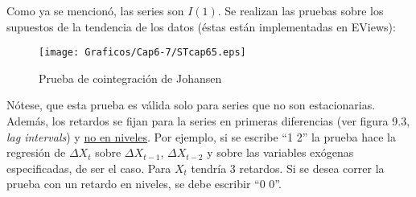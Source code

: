 Como ya se mencion\'{o}, las series son $I(1)$. Se realizan las pruebas sobre los supuestos de la tendencia de los datos (\'{e}stas est\'{a}n implementadas en EViews):

\begin{figure}[H]
\centering
\texttt{[image: Graficos/Cap6-7/STcap65.eps]}
\caption{Prueba de cointegraci\'{o}n de Johansen}
\label{fig5}
\end{figure}


N\'{o}tese, que esta prueba es v\'{a}lida solo para series que no son estacionarias. Adem\'{a}s, los retardos se fijan para la series en primeras diferencias (ver figura 9.3, \textit{lag intervals}) y \underline {no en niveles}. Por ejemplo, si se escribe ``1 2'' la prueba hace la regresi\'{o}n de $\Delta X_{t}$ sobre $\Delta X_{t-1}$, $\Delta X_{t-2}$ y sobre las variables ex\'{o}genas especificadas, de ser el caso. Para $X_{t}$ tendr\'{i}a 3 retardos. Si se desea correr la prueba con un retardo en niveles, se debe escribir ``0 0''. 
% 
% 
